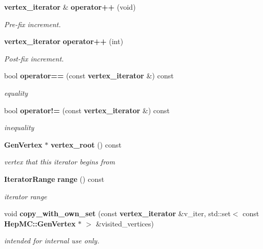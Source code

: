 \begin{CompactItemize}
{\bf vertex\_\-iterator} \& {\bf operator++} (void)
\begin{CompactList}\small\item\em Pre-fix increment. \item\end{CompactList}\item 
{\bf vertex\_\-iterator} {\bf operator++} (int)
\begin{CompactList}\small\item\em Post-fix increment. \item\end{CompactList}\item 
bool {\bf operator==} (const {\bf vertex\_\-iterator} \&) const
\begin{CompactList}\small\item\em equality \item\end{CompactList}\item 
bool {\bf operator!=} (const {\bf vertex\_\-iterator} \&) const
\begin{CompactList}\small\item\em inequality \item\end{CompactList}\item 
{\bf Gen\-Vertex} $\ast$ {\bf vertex\_\-root} () const
\begin{CompactList}\small\item\em vertex that this iterator begins from \item\end{CompactList}\item 
{\bf Iterator\-Range} {\bf range} () const
\begin{CompactList}\small\item\em iterator range \item\end{CompactList}\item 
void {\bf copy\_\-with\_\-own\_\-set} (const {\bf vertex\_\-iterator} \&v\_\-iter, std::set$<$ const {\bf Hep\-MC::Gen\-Vertex} $\ast$ $>$ \&visited\_\-vertices)
\begin{CompactList}\small\item\em intended for internal use only. \item\end{CompactList}\end{CompactItemize}
